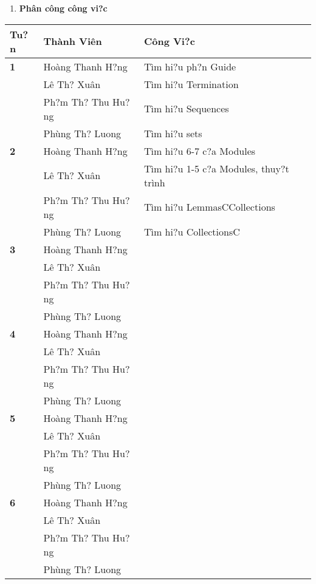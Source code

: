 \documentclass{article} %
\begin{document}
\noindent 

\begin{enumerate}
\item  \textbf{Ph\^{a}n c\^{o}ng c\^{o}ng vi?c}
\end{enumerate}

\begin{tabular}{|p{0.8in}|p{1.2in}|p{2.2in}|} \hline 
\textbf{Tu?n} & \textbf{Th\`{a}nh Vi\^{e}n} & \textbf{C\^{o}ng Vi?c} \\ \hline 
\textbf{1} & Ho\`{a}ng Thanh H?ng & T\`{i}m hi?u ph?n Guide\textbf{} \\ \hline 
\textbf{} & L\^{e} Th? Xu\^{a}n & T\`{i}m hi?u Termination \\ \hline 
\textbf{} & Ph?m Th? Thu Hu?ng & T\`{i}m hi?u Sequences\textbf{} \\ \hline 
\textbf{} & Ph\`{u}ng Th? Luong & T\`{i}m hi?u sets \\ \hline 
\textbf{2} & Ho\`{a}ng Thanh H?ng\textbf{} & T\`{i}m hi?u 6-7 c?a Modules \\ \hline 
\textbf{} & L\^{e} Th? Xu\^{a}n\textbf{} & T\`{i}m hi?u 1-5 c?a Modules, thuy?t tr\`{i}nh \\ \hline 
\textbf{} & Ph?m Th? Thu Hu?ng\textbf{} & T\`{i}m hi?u LemmasCCollections \\ \hline 
\textbf{} & Ph\`{u}ng Th? Luong\textbf{} & T\`{i}m hi?u CollectionsC \\ \hline 
\textbf{3} & Ho\`{a}ng Thanh H?ng\textbf{} & \textbf{} \\ \hline 
\textbf{} & L\^{e} Th? Xu\^{a}n\textbf{} & \textbf{} \\ \hline 
\textbf{} & Ph?m Th? Thu Hu?ng\textbf{} & \textbf{} \\ \hline 
\textbf{} & Ph\`{u}ng Th? Luong\textbf{} & \textbf{} \\ \hline 
\textbf{4} & Ho\`{a}ng Thanh H?ng\textbf{} & \textbf{} \\ \hline 
\textbf{} & L\^{e} Th? Xu\^{a}n\textbf{} & \textbf{} \\ \hline 
\textbf{} & Ph?m Th? Thu Hu?ng\textbf{} & \textbf{} \\ \hline 
\textbf{} & Ph\`{u}ng Th? Luong\textbf{} & \textbf{} \\ \hline 
\textbf{5} & Ho\`{a}ng Thanh H?ng\textbf{} & \textbf{} \\ \hline 
\textbf{} & L\^{e} Th? Xu\^{a}n\textbf{} & \textbf{} \\ \hline 
\textbf{} & Ph?m Th? Thu Hu?ng\textbf{} & \textbf{} \\ \hline 
\textbf{} & Ph\`{u}ng Th? Luong\textbf{} & \textbf{} \\ \hline 
\textbf{6} & Ho\`{a}ng Thanh H?ng\textbf{} & \textbf{} \\ \hline 
\textbf{} & L\^{e} Th? Xu\^{a}n\textbf{} & \textbf{} \\ \hline 
\textbf{} & Ph?m Th? Thu Hu?ng\textbf{} & \textbf{} \\ \hline 
\textbf{} & Ph\`{u}ng Th? Luong\textbf{} & \textbf{} \\ \hline 
\end{tabular}
\end{document}
